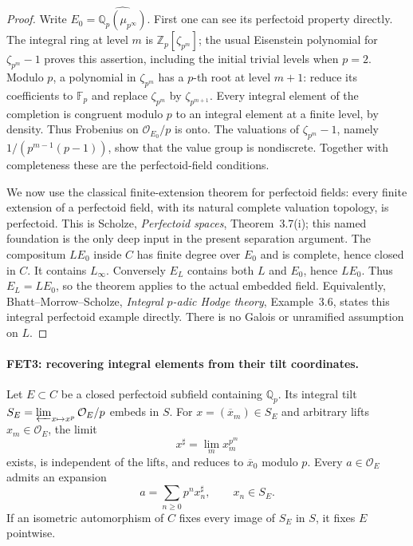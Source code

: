 \begin{proof}
Write $E_0=\widehat{\mathbb Q_p(\mu_{p^\infty})}$.
First one can see its perfectoid property directly. The integral
ring at level $m$ is $\mathbb Z_p[\zeta_{p^m}]$; the usual Eisenstein
polynomial for $\zeta_{p^m}-1$ proves this assertion, including the
initial trivial levels when $p=2$. Modulo $p$, a polynomial in
$\zeta_{p^m}$ has a $p$-th root at level $m+1$: reduce its
coefficients to $\mathbb F_p$ and replace $\zeta_{p^m}$ by
$\zeta_{p^{m+1}}$. Every integral element of the completion is
congruent modulo $p$ to an integral element at a finite level, by
density. Thus Frobenius on $\mathcal O_{E_0}/p$ is onto.
The valuations of $\zeta_{p^m}-1$, namely
$1/(p^{m-1}(p-1))$, show that the value group is nondiscrete.
Together with completeness these are the perfectoid-field conditions.

We now use the classical finite-extension theorem for perfectoid
fields: every finite extension of a perfectoid field, with its natural
complete valuation topology, is perfectoid. This is Scholze,
\emph{Perfectoid spaces}, Theorem~3.7(i); this named foundation is
the only deep input in the present separation argument.
The compositum $LE_0$ inside $C$ has finite degree over $E_0$ and
is complete, hence closed in $C$. It contains $L_\infty$.
Conversely $E_L$ contains both $L$ and $E_0$, hence $LE_0$.
Thus $E_L=LE_0$, so the theorem applies to the actual embedded field.
Equivalently, Bhatt--Morrow--Scholze, \emph{Integral $p$-adic Hodge
theory}, Example~3.6, states this integral perfectoid example directly.
There is no Galois or unramified assumption on $L$.
\end{proof}

\paragraph{FET3: recovering integral elements from their tilt coordinates.}
\label{claim:FET3}
Let $E\subset C$ be a closed perfectoid subfield containing
$\mathbb Q_p$. Its integral tilt
$S_E=\varprojlim_{x\mapsto x^p}\mathcal O_E/p$ embeds in $S$.
For $x=(\overline x_m)\in S_E$ and arbitrary lifts
$x_m\in\mathcal O_E$, the limit
\[
                     x^\sharp=\lim_m x_m^{p^m}             \tag{FET.2}
\]
exists, is independent of the lifts, and reduces to
$\overline x_0$ modulo $p$. Every $a\in\mathcal O_E$ admits an
expansion
\[
                      a=\sum_{n\geq0}p^n x_n^\sharp,
                      \qquad x_n\in S_E.                 \tag{FET.3}
\]
If an isometric automorphism of $C$ fixes every image of $S_E$ in
$S$, it fixes $E$ pointwise.


